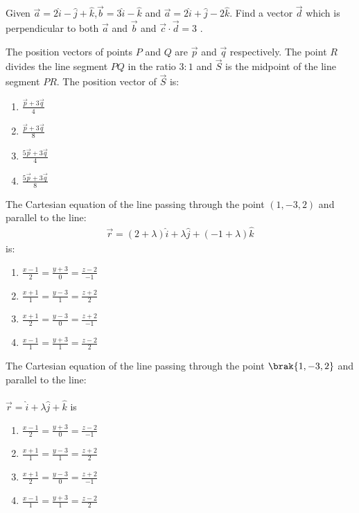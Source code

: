 


\item Given $\vec{a}=2\hat{i}-\hat{j}+\hat{k}$,$\vec{b}=3\hat{i}-\hat{k}$ and $\vec{a}=2\hat{i}+\hat{j}-2\hat{k}$. Find a vector $\vec{d}$ which is perpendicular to both $\vec{a}$ and $\vec{b}$ and $\vec{c}\cdot\vec{d}=3$ .

\item The position vectors of points $P$ and $Q$ are $\vec{p}$ and $\vec{q}$ respectively. The point $R$ divides the line segment $PQ$ in the ratio $3:1$ and $\vec{S}$ is the midpoint of the line segment $PR$. The position vector of $\vec{S}$ is:
    \begin{enumerate}[label=(\alph*)]
        \item $\frac{\vec{p} + 3\vec{q}}{4}$
        \item $\frac{\vec{p} + 3\vec{q}}{8}$
        \item $\frac{5\vec{p} + 3\vec{q}}{4}$
        \item $\frac{5\vec{p} + 3\vec{q}}{8}$
        \end{enumerate}
        
    \item The Cartesian equation of the line passing through the point $(1, -3, 2)$ and parallel to the line:
   \begin{align}
         \vec{r} = (2 + \lambda)\hat{i} + \lambda \hat{j} + (-1 + \lambda)\hat{k}
   \end{align}
    is:
    \begin{enumerate}[label=(\alph*)]
        \item $\frac{x-1}{2} = \frac{y+3}{0} = \frac{z-2}{-1}$
        \item $\frac{x+1}{1} = \frac{y-3}{1} = \frac{z+2}{2}$
   \item $\frac{x+1}{2} = \frac{y-3}{0} = \frac{z+2}{-1}$
        \item $\frac{x-1}{1} = \frac{y+3}{1} = \frac{z-2}{2}$
    \end{enumerate}


		\item The Cartesian equation of the line passing through the point $\brak{1,-3,2}$ and parallel to the line:  \\ \\                         $\overrightarrow{r} = $$ \hat{i} + \lambda \hat{j}    + $$ \hat{k}$ is                                             \begin{enumerate}                           
\item  $ \frac{x-1}{2} = \frac{y+3}{0} = \frac{z-2}{-1}$                
\item  $\frac{x+1}{1} = \frac{y-3}{1} = \frac{z+2}{2}$                  
\item  $\frac{x+1}{2} = \frac{y-3}{0} = \frac{z+2}{-1}$
\item  $\frac{x-1}{1} = \frac{y+3}{1} = \frac{z-2}{2}$
\end{enumerate} 
                                                            
